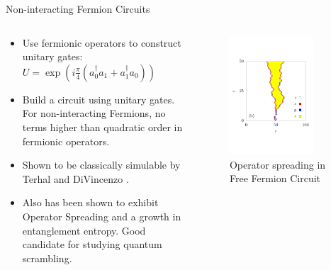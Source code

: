 \begin{frame}{Non-interacting Fermion Circuits}


    \begin{columns}
        \begin{column}{0.475\textwidth}
 
    \begin{itemize}
        \item Use fermionic operators to construct unitary gates: $U = \exp(i\frac{\pi}{4} (a^{\dagger}_{0} a_{1} + a^{\dagger}_{1}a_{0}))$ 
        \item Build a circuit using unitary gates. For non-interacting Fermions, no terms higher than quadratic order in fermionic operators.
        \item Shown to be classically simulable by Terhal and DiVincenzo \cite{Terhal_2002}.
        \item  Also has been shown to exhibit Operator Spreading and a growth in entanglement entropy. Good candidate for studying quantum scrambling.
    \end{itemize}

\end{column}
\begin{column}{0.475\textwidth}
    \begin{figure}
        \vspace{-3cm}
        \centering
        \includegraphics[width = 0.8\textwidth]{QS_Images/freefermionspread.pdf}
        \vspace{-1.5cm}
        \caption{Operator spreading in Free Fermion Circuit \cite{dias2021diffusive}}
    \end{figure}
\end{column}
   


\end{columns}
\end{frame}
